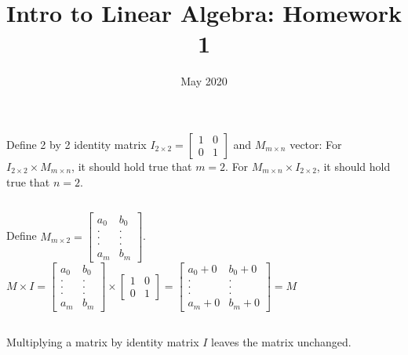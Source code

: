 \documentclass{article}
\title{Intro to Linear Algebra: Homework 1}
\date{May 2020}
\begin{document}
\maketitle
\section{}
\subsection{}
Define 2 by 2 identity matrix $I_{2\times2} = \left[\begin{array}{cc}1 & 0 \\0 & 1\end{array}\right]$ and $M_{m\times n}$ vector:\newline
For $I_{2\times2} \times M_{m\times n}$, it should hold true that $m=2$.\newline
For $M_{m\times n} \times I_{2\times2}$, it should hold true that $n=2$.
\subsection{}
Define $M_{m\times 2} = \left[\begin{array}{cc}a_0 & b_0 \\ .&.\\.&.\\.&.\\a_m & b_m\end{array}\right]$.\newline
$M \times I = \left[\begin{array}{cc}a_0 & b_0 \\ .&.\\.&.\\.&.\\a_m & b_m\end{array}\right] \times \left[\begin{array}{cc}1 & 0 \\0 & 1\end{array}\right] = \left[\begin{array}{cc}a_0 + 0 & b_0 + 0 \\.&.\\.&.\\.&.\\a_m + 0 & b_m + 0 \end{array}\right] = M $\newline
\subsection{}
Multiplying a matrix by identity matrix $I$ leaves the matrix unchanged.
\end{document}
